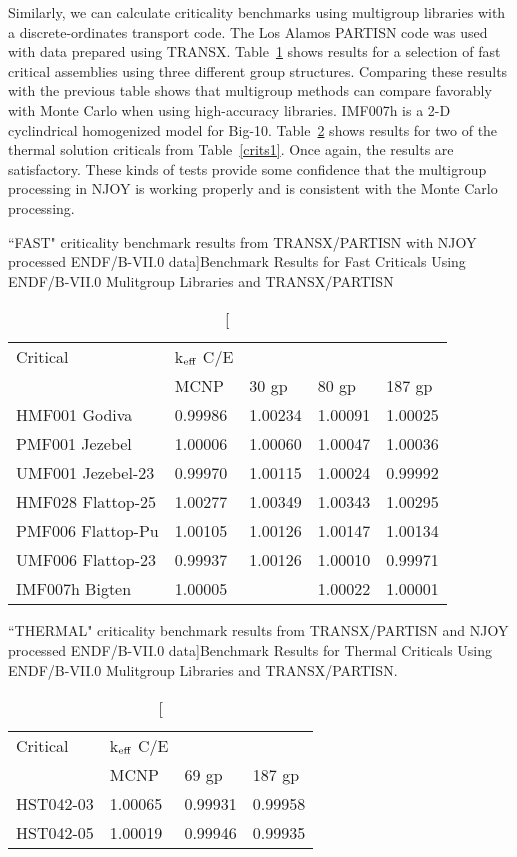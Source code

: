 Similarly, we can calculate criticality benchmarks using
multigroup libraries with a discrete-ordinates transport
code.  The Los Alamos PARTISN code was used with data
prepared using TRANSX.  Table~\ref{mg1} shows results for a
selection of fast critical assemblies using three different
group structures.  Comparing these results with the previous
table shows that multigroup methods can compare favorably
with Monte Carlo when using high-accuracy libraries.
IMF007h is a 2-D cyclindrical homogenized model for
Big-10.  Table~\ref{mg2} shows results for two of the thermal
solution criticals from Table~\ref{crits1}.  Once again, the
results are satisfactory.  These kinds of tests provide some
confidence that the multigroup processing in NJOY is working
properly and is consistent with the Monte Carlo processing.

\begin{table}[tp]
\caption[``FAST" criticality benchmark results from TRANSX/PARTISN
 with NJOY processed ENDF/B-VII.0 data]{Benchmark Results for Fast
 Criticals Using ENDF/B-VII.0 Mulitgroup Libraries and TRANSX/PARTISN}
\setlength{\extrarowheight}{1pt}
\begin{center}
\begin{tabular}{lllll}
Critical & k$_{\rm eff}$ C/E \\
                  & MCNP  &   30 gp   & 80 gp   &  187 gp \\ \hline
HMF001 Godiva     & 0.99986 & 1.00234 & 1.00091 & 1.00025 \\
PMF001 Jezebel    & 1.00006 & 1.00060 & 1.00047 & 1.00036 \\
UMF001 Jezebel-23 & 0.99970 & 1.00115 & 1.00024 & 0.99992 \\
HMF028 Flattop-25 & 1.00277 & 1.00349 & 1.00343 & 1.00295 \\
PMF006 Flattop-Pu & 1.00105 & 1.00126 & 1.00147 & 1.00134 \\
UMF006 Flattop-23 & 0.99937 & 1.00126 & 1.00010 & 0.99971 \\
IMF007h Bigten    & 1.00005 &         & 1.00022 & 1.00001 \\ \hline
\end{tabular}
\end{center}
\label{mg1}
\end{table}

\begin{table}[bp]
\caption[``THERMAL" criticality benchmark results from TRANSX/PARTISN
 and NJOY processed ENDF/B-VII.0 data]{Benchmark Results for Thermal
 Criticals Using ENDF/B-VII.0 Mulitgroup Libraries and TRANSX/PARTISN.}
\begin{center}
\begin{tabular}{llll}
Critical & k$_{\rm eff}$ C/E \\
         &  MCNP   & 69 gp   &   187 gp  \\ \hline
HST042-03 & 1.00065 & 0.99931 & 0.99958 \\
HST042-05 & 1.00019 & 0.99946 & 0.99935 \\ \hline
\end{tabular}
\end{center}
\label{mg2}
\end{table}

